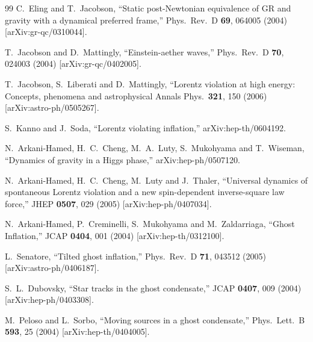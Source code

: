 \begin{thebibliography}{99}
  C.~Eling and T.~Jacobson,
   ``Static post-Newtonian equivalence of GR and gravity with a dynamical
  preferred frame,''
  Phys.\ Rev.\ D {\bf 69}, 064005 (2004)
  [arXiv:gr-qc/0310044].

  T.~Jacobson and D.~Mattingly,
  ``Einstein-aether waves,''
  Phys.\ Rev.\ D {\bf 70}, 024003 (2004)
  [arXiv:gr-qc/0402005].

  T.~Jacobson, S.~Liberati and D.~Mattingly,
   ``Lorentz violation at high energy: Concepts, phenomena and astrophysical
  Annals Phys.\  {\bf 321}, 150 (2006)
  [arXiv:astro-ph/0505267].

  S.~Kanno and J.~Soda,
  ``Lorentz violating inflation,''
  arXiv:hep-th/0604192.

  N.~Arkani-Hamed, H.~C.~Cheng, M.~A.~Luty, S.~Mukohyama and T.~Wiseman,
  ``Dynamics of gravity in a Higgs phase,''
  arXiv:hep-ph/0507120. 

  N.~Arkani-Hamed, H.~C.~Cheng, M.~Luty and J.~Thaler,
  ``Universal dynamics of spontaneous Lorentz violation and a new
  spin-dependent inverse-square law force,''
  JHEP {\bf 0507}, 029 (2005)
  [arXiv:hep-ph/0407034].

  N.~Arkani-Hamed, P.~Creminelli, S.~Mukohyama and M.~Zaldarriaga,
 ``Ghost Inflation,''
  JCAP {\bf 0404}, 001 (2004)
  [arXiv:hep-th/0312100].

  L.~Senatore,
  ``Tilted ghost inflation,''
  Phys.\ Rev.\ D {\bf 71}, 043512 (2005)
  [arXiv:astro-ph/0406187].

  S.~L.~Dubovsky,
  ``Star tracks in the ghost condensate,''
  JCAP {\bf 0407}, 009 (2004)
  [arXiv:hep-ph/0403308].

  M.~Peloso and L.~Sorbo,
  ``Moving sources in a ghost condensate,''
  Phys.\ Lett.\ B {\bf 593}, 25 (2004)
  [arXiv:hep-th/0404005].


\end{thebibliography}
